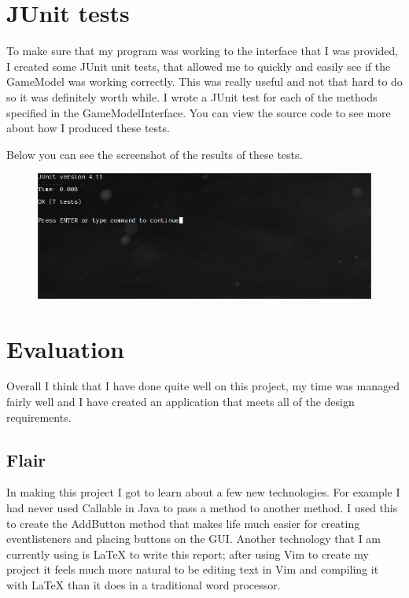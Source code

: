 \documentclass[notitlepage]{report}
\begin{document}
\section{JUnit tests}
To make sure that my program was working to the interface that I was provided, I created some JUnit unit tests, that allowed me to quickly and easily see if the GameModel was working correctly. This was really useful and not that hard to do so it was definitely worth while. I wrote a JUnit test for each of the methods specified in the GameModelInterface. You can view the source code to see more about how I produced these tests.

Below you can see the screenshot of the results of these tests.

\begin{figure}
  \centerline{\includegraphics[scale=0.5]{junit}}
  \label{fig:label}
\end{figure}

\section{Evaluation}
Overall I think that I have done quite well on this project, my time was managed fairly well and I have created an application that meets all of the design requirements.

\subsection{Flair}
In making this project I got to learn about a few new technologies. For example I had never used Callable in Java to pass a method to another method. I used this to create the AddButton method that makes life much easier for creating eventlisteners and placing buttons on the GUI. Another technology that I am currently using is LaTeX to write this report; after using Vim to create my project it feels much more natural to be editing text in Vim and compiling it with LaTeX than it does in a traditional word processor.
\end{document}
